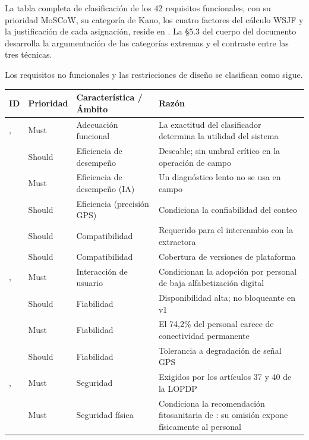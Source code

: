 La tabla completa de clasificación de los 42 requisitos funcionales, con su prioridad MoSCoW, su
categoría de Kano, los cuatro factores del cálculo WSJF y la justificación de cada asignación,
reside en \allowbreak{}. La §5.3 del cuerpo del documento
desarrolla la argumentación de las categorías extremas y el contraste entre las tres técnicas.

Los requisitos no funcionales y las restricciones de diseño se clasifican como sigue.

\begin{longtable}{|C{2.0cm}|C{2.0cm}|L{5.0cm}|L{5.4cm}|}
\hline
{}\textbf{ID} & \textbf{Prioridad} & \textbf{Característica / Ámbito} & \textbf{Razón} \\
\hline
\endhead
{},  & Must & Adecuación funcional & La exactitud del clasificador determina la utilidad del sistema \\ \hline
{} & Should & Eficiencia de desempeño & Deseable; sin umbral crítico en la operación de campo \\ \hline
{} & Must & Eficiencia de desempeño (IA) & Un diagnóstico lento no se usa en campo \\ \hline
{} & Should & Eficiencia (precisión GPS) & Condiciona la confiabilidad del conteo \\ \hline
{} & Should & Compatibilidad & Requerido para el intercambio con la extractora \\ \hline
{} & Should & Compatibilidad & Cobertura de versiones de plataforma \\ \hline
{},  & Must & Interacción de usuario & Condicionan la adopción por personal de baja alfabetización digital \\ \hline
{} & Should & Fiabilidad & Disponibilidad alta; no bloqueante en v1 \\ \hline
{} & Must & Fiabilidad & El 74{,}2\% del personal carece de conectividad permanente \\ \hline
{} & Should & Fiabilidad & Tolerancia a degradación de señal GPS \\ \hline
{},  & Must & Seguridad & Exigidos por los artículos 37 y 40 de la LOPDP \\ \hline
{} & Must & Seguridad física & Condiciona la recomendación fitosanitaria de : su omisión expone físicamente al personal \\ \hline

\end{longtable}
